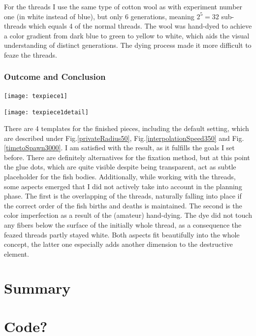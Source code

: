 \documentclass{scrartcl}
\begin{document}
For the threads I use the same type of cotton wool as with experiment number one (in white instead of blue), but only 6 generations, meaning $2^5 = 32$ sub-threads which equals 4 of the normal threads. The wool was hand-dyed to achieve a color gradient from dark blue to green to yellow to white, which aids the visual understanding of distinct generations. The dying process made it more difficult to feaze the threads.

\subsubsection{Outcome and Conclusion}

\begin{minipage}[t]{0.46\textwidth}
\texttt{[image: texpiece1]}
\end{minipage}
\hspace{0.5cm}
\begin{minipage}[t]{0.46\textwidth}
\texttt{[image: texpiece1detail]}
\end{minipage}

There are 4 templates for the finished pieces, including the default setting, which are described under Fig.\ref{privateRadius50}, Fig.\ref{interpolationSpeed350} and Fig.\ref{timetoSpawn3000}.
I am satisfied with the result, as it fulfills the goals I set before.
There are definitely alternatives for the fixation method, but at this point the glue dots, which are quite visible despite being transparent, act as subtle placeholder for the fish bodies.
Additionally, while working with the threads, some aspects emerged that I did not actively take into account in the planning phase. 
The first is the overlapping of the threads, naturally falling into place if the correct order of the fish births and deaths is maintained.
The second is the color imperfection as a result of the (amateur) hand-dying. The dye did not touch any fibers below the surface of the initially whole thread, as a consequence the feazed threads partly stayed white.
Both aspects fit beautifully into the whole concept, the latter one especially adds another dimension to the destructive element.

\section{Summary}




\newpage
\section*{Code?}


%
%
\end{document}
